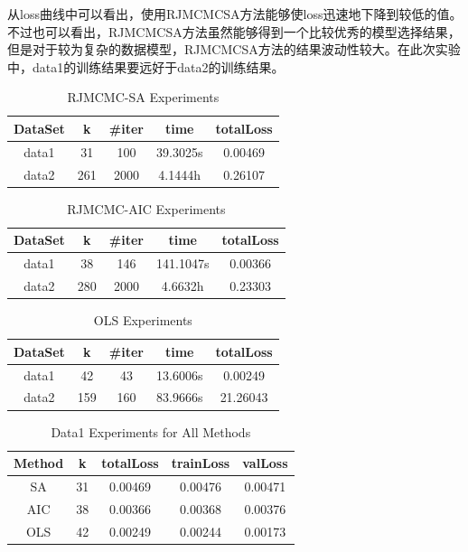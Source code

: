 \documentclass[twocolumn]{article}
\begin{document}
从loss曲线中可以看出，使用RJMCMCSA方法能够使loss迅速地下降到较低的值。不过也可以看出，RJMCMCSA方法虽然能够得到一个比较优秀的模型选择结果，但是对于较为复杂的数据模型，RJMCMCSA方法的结果波动性较大。在此次实验中，data1的训练结果要远好于data2的训练结果。

\begin{table}[htb]
\centering
\begin{tabular}{c|cccc}
\hline
DataSet & k & \#iter & time & totalLoss \\
\hline
data1 & 31 & 100 & 39.3025s & 0.00469 \\
data2 & 261 & 2000 & 4.1444h & 0.26107 \\
\hline
\end{tabular}
\caption{RJMCMC-SA Experiments}
\end{table}

\begin{table}[htb]
\centering
\begin{tabular}{c|cccc}
\hline
DataSet & k & \#iter & time & totalLoss \\
\hline
data1 & 38 & 146 & 141.1047s & 0.00366 \\
data2 & 280 & 2000 & 4.6632h & 0.23303 \\
\hline
\end{tabular}
\caption{RJMCMC-AIC Experiments}
\end{table}

\begin{table}[H]
\centering
\begin{tabular}{c|cccc}
\hline
DataSet & k & \#iter & time & totalLoss \\
\hline
data1 & 42 & 43 & 13.6006s & 0.00249 \\
data2 & 159 & 160 & 83.9666s & 21.26043 \\
\hline
\end{tabular}
\caption{OLS Experiments}
\end{table}

\begin{table}[H]
\centering
\begin{tabular}{c|cccc}
\hline
Method & k & totalLoss & trainLoss & valLoss \\
\hline
SA & 31 & 0.00469 & 0.00476 & 0.00471 \\
AIC & 38 & 0.00366 & 0.00368 & 0.00376 \\
OLS & 42 & 0.00249 & 0.00244 & 0.00173 \\
\hline
\end{tabular}
\caption{Data1 Experiments for All Methods}
\end{table}
\end{document}
